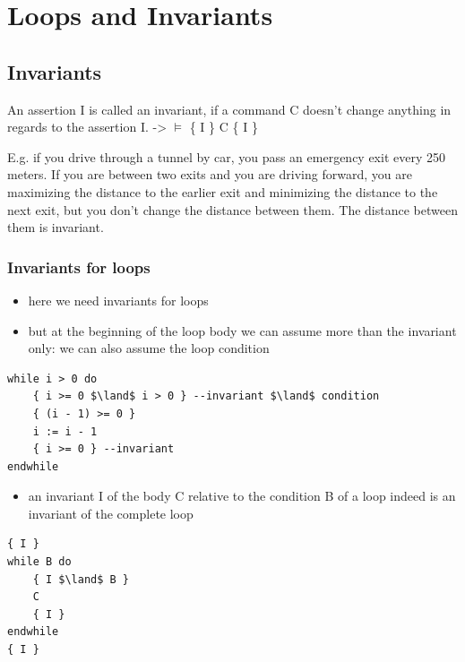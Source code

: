 \hypertarget{loops-and-invariants}{%
\section{Loops and Invariants}\label{loops-and-invariants}}

\hypertarget{invariants}{%
\subsection{Invariants}\label{invariants}}

An assertion I is called an invariant, if a command C doesn't change
anything in regards to the assertion I. -\textgreater{} $\models$ \{ I \} C \{ I
\}

E.g. if you drive through a tunnel by car, you pass an emergency exit
every 250 meters. If you are between two exits and you are driving
forward, you are maximizing the distance to the earlier exit and
minimizing the distance to the next exit, but you don't change the
distance between them. The distance between them is invariant.

\hypertarget{invariants-for-loops}{%
\subsubsection{Invariants for loops}\label{invariants-for-loops}}

\begin{itemize}
\tightlist
\item
  here we need invariants for loops
\item
  but at the beginning of the loop body we can assume more than the
  invariant only: we can also assume the loop condition
\end{itemize}

\begin{lstlisting}
while i > 0 do
    { i >= 0 $\land$ i > 0 } --invariant $\land$ condition
    { (i - 1) >= 0 }
    i := i - 1
    { i >= 0 } --invariant
endwhile
\end{lstlisting}

\begin{itemize}
\tightlist
\item
  an invariant I of the body C relative to the condition B of a loop
  indeed is an invariant of the complete loop
\end{itemize}

\begin{lstlisting}
{ I }
while B do
    { I $\land$ B }
    C
    { I }
endwhile
{ I }
\end{lstlisting}

